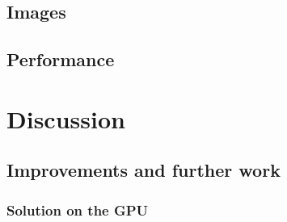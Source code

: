 \documentclass[10pt,a4paper]{article}
\begin{document}
\subsection{Images}

\subsection{Performance}

\section{Discussion}
\subsection{Improvements and further work}
\subsubsection{Solution on the GPU}





\pagebreak
{}


\end{document}
